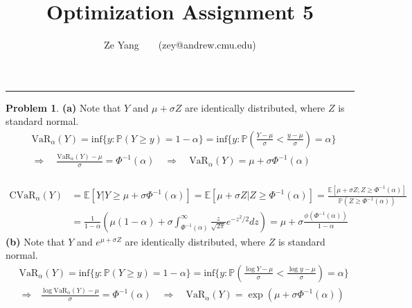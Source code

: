 \documentclass[a4paper, 8pt]{article}
\title{\textbf{Optimization Assignment 5}}
\author{Ze Yang~~~~(zey@andrew.cmu.edu)}
\theoremstyle{definition}
\newtheorem{problem}{Problem}
\theoremstyle{hSol}
\begin{document}
\maketitle

\noindent\rule{16cm}{0.4pt}
\begin{problem} \textbf{(a)} Note that $Y$ and $\mu + \sigma Z$ are identically distributed, where $Z$ is standard normal.
\begin{equation}
	\begin{split}
		&\text{VaR}_{\alpha}(Y) = \text{inf}\{y: \mathbb{P}\left(Y\geq y\right) = 1- \alpha\} =\text{inf}\{y: \mathbb{P}\left(\frac{Y-\mu}{\sigma}< \frac{y-\mu}{\sigma}\right) = \alpha\}\\
		&\Rightarrow\quad \frac{\text{VaR}_{\alpha}(Y)-\mu}{\sigma}=\Phi^{-1}(\alpha) \quad \Rightarrow\quad  \text{VaR}_{\alpha}(Y)=\mu + \sigma \Phi^{-1}(\alpha) 
	\end{split}
\end{equation}
~\\
\begin{equation}
	\begin{split}
		\text{CVaR}_{\alpha}(Y) &= \mathbb{E}\left[Y | Y\geq\mu + \sigma \Phi^{-1}(\alpha) \right] =\mathbb{E}\left[\mu + \sigma Z | Z \geq\Phi^{-1}(\alpha) \right] = \frac{\mathbb{E}\left[\mu + \sigma Z ; Z \geq\Phi^{-1}(\alpha) \right]}{\mathbb{P}\left(Z \geq\Phi^{-1}(\alpha)\right)}\\
		&= \frac{1}{1- \alpha }\left(\mu(1- \alpha) + \sigma\int_{\Phi^{-1}(\alpha)}^{\infty} \frac{z}{\sqrt{2\pi}} e^{-z^2/2}dz\right)= \mu + \sigma\frac{\phi(\Phi^{-1}(\alpha))}{1- \alpha}
	\end{split}
\end{equation}
\textbf{(b)} Note that $Y$ and $e^{\mu + \sigma Z}$ are identically distributed, where $Z$ is standard normal.
\begin{equation}
	\begin{split}
		&\text{VaR}_{\alpha}(Y) = \text{inf}\{y: \mathbb{P}\left(Y\geq y\right) = 1- \alpha\} =\text{inf}\{y: \mathbb{P}\left(\frac{\log Y-\mu}{\sigma}< \frac{\log y-\mu}{\sigma}\right) = \alpha\}\\
		&\Rightarrow~~~\frac{\log \text{VaR}_{\alpha}(Y)-\mu}{\sigma}=\Phi^{-1}(\alpha) \quad \Rightarrow \quad\text{VaR}_{\alpha}(Y)= \exp\left(\mu + \sigma \Phi^{-1}(\alpha) \right)
	\end{split}
\end{equation}
~\\

\end{problem}
\end{document}
